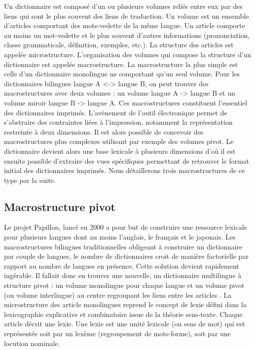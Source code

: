 \documentclass[10pt,a4paper,twoside]{article}
\begin{document}
Un dictionnaire est composé d'un ou plusieurs volumes reliés entre eux par des liens qui sont le plus souvent des liens de traduction. Un volume est un ensemble d'articles comportant des mots-vedette de la même langue. Un article comporte au moins un mot-vedette et le plus souvent d'autres informations (prononciation, classe grammaticale, définition, exemples, etc.). La structure des articles est appelée microstructure. L'organisation des volumes qui compose la structure d'un dictionnaire est appelée macrostructure. La macrostructure la plus simple est celle d'un dictionnaire monolingue ne comportant qu'un seul volume. Pour les dictionnaires bilingues langue A <-> langue B, on peut trouver des macrostructures avec deux volumes : un volume langue A -> langue B et un volume miroir langue B -> langue A. Ces macrostructures constituent l'essentiel des dictionnaires imprimés. L'avènement de l'outil électronique permet de s'abstraire des contraintes liées à l'impression, notamment la représentation restreinte à deux dimensions. Il est alors possible de concevoir des macrostructures plus complexes utilisant par exemple des volumes pivot. Le dictionnaire devient alors une base lexicale à plusieurs dimensions d'où il est ensuite possible d'extraire des vues spécifiques permettant de retrouver le format initial des dictionnaires imprimés.
Nous détaillerons trois macrostructures de ce type par la suite.

\subsection{Macrostructure pivot}

Le projet Papillon, lancé en 2000 \cite{MTMMEP00} a pour but de construire une ressource lexicale pour plusieurs langues dont au moins l'anglais, le français et le japonais. Les macrostructures bilingues traditionnelles obligeant à construire un dictionnaire par couple de langues, le nombre de dictionnaires croit de manière factorielle par rapport au nombre de langues en présence. Cette solution devient rapidement ingérable. Il fallait donc en trouver une nouvelle, un dictionnaire multilingue à structure pivot : un volume monolingue pour chaque langue et un volume pivot (ou volume interlingue) au centre regroupant les liens entre les articles \cite{GSMM01a}. La microstructure des article monolingues reprend le concept de lexie défini dans la lexicographie explicative et combinatoire \cite{MelcukClasPolguere95} issue de la théorie sens-texte. Chaque article décrit une lexie. Une lexie est une unité lexicale (ou sens de mot) qui est représentée soit par un lexème (regroupement de mots-forme), soit par une locution nominale.
\end{document}
